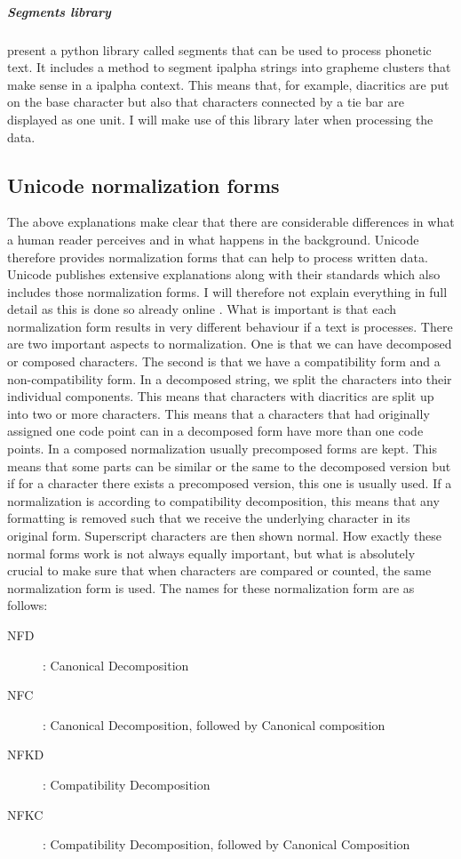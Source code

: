\subparagraph{Segments library} \citet{unicode-lingu} present a python library called segments that can be used to process phonetic text. It includes a method to segment \ac{ipalpha} strings into grapheme clusters that make sense in a \ac{ipalpha} context. This means that, for example, diacritics are put on the base character but also that characters connected by a tie bar are displayed as one unit. I will make use of this library later when processing the data.

\subsection{Unicode normalization forms}
The above explanations make clear that there are considerable differences in what a human reader perceives and in what happens in the background. Unicode therefore provides normalization forms that can help to process written data.  Unicode publishes extensive explanations along with their standards which also includes those normalization forms. I will therefore not explain everything in full detail as this is done so already online \citep{Unicode.27.08.2021}. What is important is that each normalization form results in very different behaviour if a text is processes. There are two important aspects to normalization. One is that we can have decomposed or composed characters. The second is that we have a compatibility form and a non-compatibility form. In a decomposed string, we split the characters into their individual components. This means that characters with diacritics are split up into two or more characters. This means that a characters that had originally assigned one code point can in a decomposed form have more than one code points. In a composed normalization usually precomposed forms are kept. This means that some parts can be similar or the same to the decomposed version but if for a character there exists a precomposed version, this one is usually used. If a normalization is according to compatibility decomposition, this means that any formatting is removed such that we receive the underlying character in its original form. Superscript characters are then shown normal. How exactly these normal forms work is not always equally important, but what is absolutely crucial to make sure that when characters are compared or counted, the same normalization form is used.  The names for these normalization form are as follows:

\begin{description}
\item[NFD] : Canonical Decomposition
\item[NFC] : Canonical Decomposition, followed by Canonical composition
\item[NFKD] : Compatibility Decomposition
\item[NFKC] : Compatibility Decomposition, followed by Canonical Composition
\end{description}





